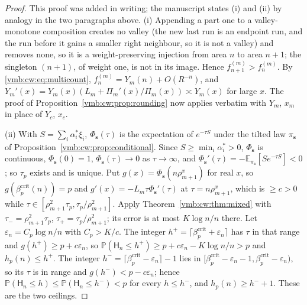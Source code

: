 \documentclass[11pt,a4paper]{article}
\numberwithin{equation}{section}
\theoremstyle{definition}\newtheorem{definition}[theorem]{Definition}
\theoremstyle{remark}\newtheorem{remark}[theorem]{Remark}
\newcommand{\E}{\mathbb E}
\newcommand{\Prob}{\mathbb P}
\begin{document}
\begin{proof}
This proof was added in writing; the manuscript states (i) and (ii) by
analogy in the two paragraphs above.
(i) Appending a part one to a valley-monotone composition creates no
valley (the new last run is an endpoint run, and the run before it gains a
smaller right neighbour, so it is not a valley) and removes none, so it is a
weight-preserving injection from area $n$ to area $n+1$; the singleton
$(n+1)$, of weight one, is not in its image. Hence $f^{(m)}_{n+1}>f^{(m)}_n$.
By \eqref{vmb:cw:eq:multicount}, $f^{(m)}_n=Y_m(n)+O(R^{-n})$, and
$Y_m'(x)=Y_m(x)(L_m+\Pi_m'(x)/\Pi_m(x))\asymp Y_m(x)$ for large $x$. The proof
of Proposition~\ref{vmb:cw:prop:rounding} now applies verbatim with $Y_m$, $x_m$
in place of $Y_c$, $x_c$.

(ii) With $S=\sum_i\alpha_i^*\xi_i$, $\Phi_{\bm s}(\tau)$ is the expectation
of $e^{-\tau S}$ under the tilted law $\pi_{\bm s}$ of
Proposition~\ref{vmb:cw:prop:conditional}. Since $S\ge\min_i\alpha_i^*>0$,
$\Phi_{\bm s}$ is continuous, $\Phi_{\bm s}(0)=1$, $\Phi_{\bm s}(\tau)\to0$
as $\tau\to\infty$, and $\Phi_{\bm s}'(\tau)=-\E_{\pi_{\bm s}}[Se^{-\tau S}]<0$;
so $\tau_p$ exists and is unique. Put $g(x)=\Phi_{\bm s}(n\rho_{m+1}^x)$ for
real $x$, so $g(\beta^{\mathrm{crit}}_p(n))=p$ and
$g'(x)=-L_m\tau\Phi_{\bm s}'(\tau)$ at $\tau=n\rho_{m+1}^x$, which is
$\ge c>0$ while $\tau\in[\rho_{m+1}^2\tau_p,\tau_p/\rho_{m+1}^2]$. Apply
Theorem~\ref{vmb:cw:thm:mixed} with $\tau_-=\rho_{m+1}^2\tau_p$,
$\tau_+=\tau_p/\rho_{m+1}^2$; its error is at most $K\log n/n$ there. Let
$\varepsilon_n=C_p\log n/n$ with $C_p>K/c$. The integer
$h^+=\lceil\beta^{\mathrm{crit}}_p+\varepsilon_n\rceil$ has $\tau$ in that
range and $g(h^+)\ge p+c\varepsilon_n$, so
$\Prob(\mathsf H_n\le h^+)\ge p+c\varepsilon_n-K\log n/n>p$ and
$h_p(n)\le h^+$. The integer $h^-=\lceil\beta^{\mathrm{crit}}_p-\varepsilon_n\rceil-1$
lies in $[\beta^{\mathrm{crit}}_p-\varepsilon_n-1,\beta^{\mathrm{crit}}_p-\varepsilon_n)$,
so its $\tau$ is in range and $g(h^-)<p-c\varepsilon_n$; hence
$\Prob(\mathsf H_n\le h)\le\Prob(\mathsf H_n\le h^-)<p$ for every $h\le h^-$,
and $h_p(n)\ge h^-+1$. These are the two ceilings.
\end{proof}
\end{document}
